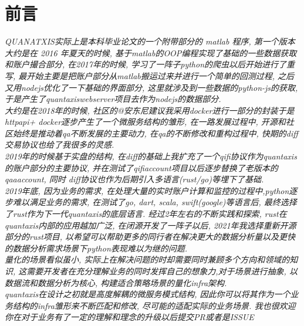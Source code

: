 \documentclass{scrartcl}
\numberwithin{equation}{section}   %
\begin{document}
\maketitle
\lhead{}
\chead{}
\cfoot{}
\rfoot{\thepage}

\setlength{\hoffset}{0mm}
\setlength{\voffset}{0mm}
\newpage
\renewcommand{\headrulewidth}{0.4pt}
\renewcommand{\footrulewidth}{0.4pt}
\setcounter{secnumdepth}{3}
\setcounter{tocdepth}{3}

\tableofcontents
\etocsettocstyle{\subsection*{\contentsname}}{}

\newpage
\section{前言}
\textsl{QUANATXIS实际上是本科毕业论文的一个附带部分的 matlab 程序, 第一个版本大约是在 2016 年夏天的时候, 基于matlab的OOP编程实现了基础的一些数据获取和账户撮合部分, 在2017年的时候, 学习了一阵子python的爬虫以后开始进行了重写, 最开始主要是把账户部分从matlab搬运过来并进行一个简单的回测过程, 之后又用nodejs优化了一下基础的界面部分, 这里就涉及到一些数据的python-js的获取, 于是产生了quantaxiswebserver项目去作为nodejs的数据部分.\\ 大约是在2018年的时候, 社区的@安东尼建议我采用docker进行一部分的封装于是 httpapi+ docker逐步产生了一个微服务结构的雏形, 在一路发展过程中, 开源和社区始终是推动着qa不断发展的主要动力, 在qa的不断修改和重构过程中, 快期的diff交易协议也给了我很多的灵感.\\ 2019年的时候基于实盘的结构, 在diff的基础上我扩充了一个qifi协议作为quantaxis的账户部分的主要协议, 并在测试了qifiaccount项目以后逐步替换了老版本的qaaaccount, 同时 diff协议也作为后期引入多语言(rust/go)等埋下了基础. \\2019年底, 因为业务的需求, 在处理大量的实时账户计算和监控的过程中,python逐步难以满足业务的需求, 在测试了go, dart, scala, swift(google)等语言后, 最终选择了rust作为下一代quantaxis的底层语言. 经过2年左右的不断实践和探索, rust在quantaxis内部的应用越加广泛, 在闭源开发了一阵子以后, 2021年我选择重新开源部分的rust项目, 以希望可以帮助更多的同行者在解决更大的数据分析量以及更快的数据分析需求场景下python表现难以为继的问题.\\ 量化的场景看似虽小, 实际上在解决问题的时却需要同时兼顾多个方向和领域的知识, 这需要开发者在充分理解业务的同时发挥自己的想象力,对于场景进行抽象, 以数据流和数据分析为核心, 构建适合策略场景的量化infra架构. \\quantaxis在设计之初就是高度解耦的微服务模式结构, 因此你可以将其作为一个业务结构的infra雏形来不断匹配和修改, 尽可能的适配实际的业务场景. 我也很欢迎你在对于业务有了一定的理解和理念的升级以后提交PR或者是ISSUE}
\end{document}
